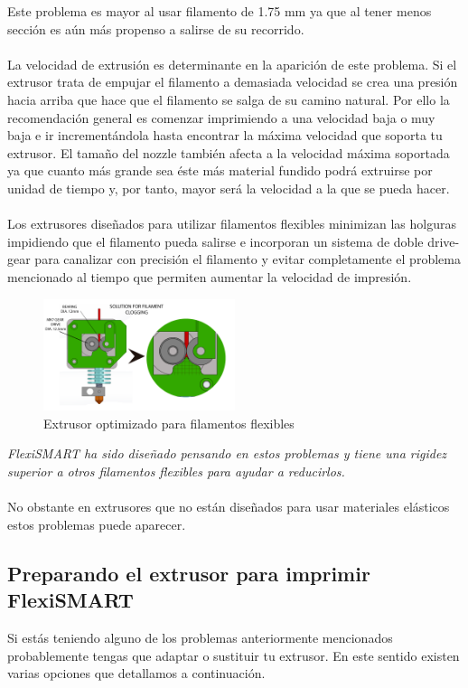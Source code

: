 \documentclass[11pt,a4paper]{article}
\begin{document}
Este problema es mayor al usar filamento de 1.75 mm ya que al tener menos sección es aún más propenso a salirse de su recorrido.
\\\\
La velocidad de extrusión es determinante en la aparición de este problema. Si el extrusor trata de empujar el filamento a demasiada velocidad se crea una presión hacia arriba que hace que el filamento se salga de su camino natural. Por ello la recomendación general es comenzar imprimiendo a una velocidad baja o muy baja e ir incrementándola hasta encontrar la máxima velocidad que soporta tu extrusor. El tamaño del nozzle también afecta a la velocidad máxima soportada ya que cuanto más grande sea éste más material fundido podrá extruirse por unidad de tiempo y, por tanto, mayor será la velocidad a la que se pueda hacer.
\\\\
Los extrusores diseñados para utilizar filamentos flexibles minimizan las holguras impidiendo que el filamento pueda salirse e incorporan un sistema de doble drive-gear para canalizar con precisión el filamento y evitar completamente el problema mencionado al tiempo que permiten aumentar la velocidad de impresión.
\begin{figure}[H]
\centering
\includegraphics[width=0.5\textwidth,cfbox=azul_marcos 4pt 0pt]{FOTOS/NUDOS2}
\caption*{Extrusor optimizado para filamentos flexibles}
\end{figure}
\emph{FlexiSMART ha sido diseñado pensando en estos problemas y tiene una rigidez superior a otros filamentos flexibles para ayudar a reducirlos.}
\\\\
No obstante en extrusores que no están diseñados para usar materiales elásticos estos problemas puede aparecer.
	\subsection{Preparando el extrusor para imprimir FlexiSMART}Si estás teniendo alguno de los problemas anteriormente mencionados probablemente tengas que adaptar o sustituir tu extrusor. En este sentido existen varias opciones que detallamos a continuación.
\end{document}
